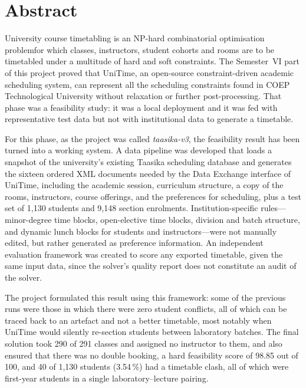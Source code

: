 \section*{Abstract}

University course timetabling is an NP-hard combinatorial optimisation problemfor which classes, instructors, student cohorts and rooms are to be timetabled under a multitude of hard and soft constraints. The Semester~VI part of this project proved that UniTime, an open-source constraint-driven academic scheduling system, can represent all the scheduling constraints found in COEP Technological University without relaxation or further post-processing. That phase was a feasibility study: it was a local deployment and it was fed with representative test data but not with institutional data to generate a timetable.

For this phase, as the project was called \emph{taasika-v3}, the feasibility result has been turned into a working system. A data pipeline was developed that loads a snapshot of the university's existing Taasika scheduling database and generates the sixteen ordered XML documents needed by the Data Exchange interface of UniTime, including the academic session, curriculum structure, a copy of the rooms, instructors, course offerings, and the preferences for scheduling, plus a test set of 1{,}130 students and 9{,}148 section enrolments. Institution-specific rules---minor-degree time blocks, open-elective time blocks, division and batch structure, and dynamic lunch blocks for students and instructors---were not manually edited, but rather generated as preference information. An independent evaluation framework was created to score any exported timetable, given the same input data, since the solver's quality report does not constitute an audit of the solver.

The project formulated this result using this framework: some of the previous runs were those in which there were zero student conflicts, all of which can be traced back to an artefact and not a better timetable, most notably when UniTime would silently re-section students between laboratory batches. The final solution took 290 of 291 classes and assigned no instructor to them, and also ensured that there was no double booking, a hard feasibility score of 98.85 out of 100, and 40 of 1{,}130 students (3.54\,\%) had a timetable clash, all of which were first-year students in a single laboratory--lecture pairing.

